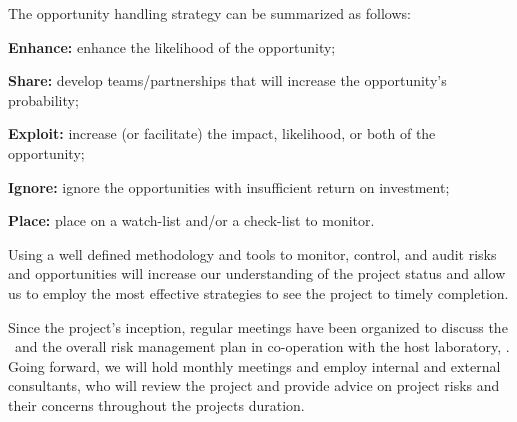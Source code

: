 The opportunity handling strategy can be summarized as follows:

\begin{compactitem}
\item[\bf Enhance:] enhance the likelihood of the opportunity; 
\item[\bf Share:] develop teams/partnerships that will increase the opportunity's probability; 
\item[\bf Exploit:] increase (or facilitate) the impact, likelihood, or both of the opportunity;
\item[\bf Ignore:] ignore the opportunities with insufficient  return on investment; 
\item[\bf Place:] place on a watch-list and/or a check-list to monitor.
\end{compactitem}

Using a well defined methodology and tools to monitor, control, and audit risks and opportunities will increase our understanding of the project status and allow us to employ the most effective strategies to see the project to timely completion.

Since the project's inception, regular meetings have been organized to discuss the \WBS\ and the overall risk management plan in co-operation with the host laboratory, \LNGS.  Going forward, we will hold monthly meetings and employ internal and external consultants, who will review the project and provide advice on project risks and their concerns throughout the projects duration.